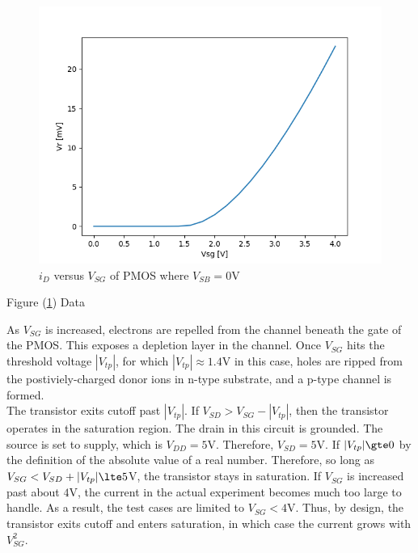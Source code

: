 
\FloatBarrier

\begin{figure}[h!]
	\centering
	\includegraphics[scale=0.75]{../images/data_3.PNG}
	\caption{$i_{D}$ versus $V_{SG}$ of PMOS where $V_{SB}= 0$\si{\volt}}
	\label{fig:data_3}
\end{figure}

\FloatBarrier

\FloatBarrier

\begin{table}[h!]
	\centering
	\caption{Figure (\ref{fig:data_3}) Data}
	\label{tab:data_3}
\end{table}

\FloatBarrier

As $V_{SG}$ is increased, electrons are repelled from the channel beneath the gate of the PMOS.
This exposes a depletion layer in the channel.
Once $V_{SG}$ hits the threshold voltage $|V_{tp}|$, for which $|V_{tp}| \approx 1.4$\si{\volt} in this case, holes are ripped from the postiviely-charged donor ions in n-type substrate, and a p-type channel is formed. \\

The transistor exits cutoff past $|V_{tp}|$.
If $V_{SD} > V_{SG} - |V_{tp}|$, then the transistor operates in the saturation region.
The drain in this circuit is grounded.
The source is set to supply, which is $V_{DD} = 5$\si{\volt}.
Therefore, $V_{SD} = 5$\si{\volt}.
If $|V_{tp}| \gte 0$ by the definition of the absolute value of a real number.
Therefore, so long as $V_{SG} < V_{SD} + |V_{tp}| \lte 5$\si{\volt}, the transistor stays in saturation.
If $V_{SG}$ is increased past about $4$\si{\volt}, the current in the actual experiment becomes much too large to handle.
As a result, the test cases are limited to $V_{SG} < 4$\si{\volt}.
Thus, by design, the transistor exits cutoff and enters saturation, in which case the current grows with $V_{SG}^{2}$. \\

